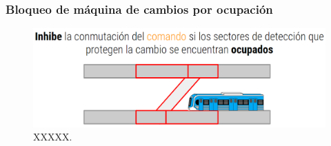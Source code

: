 \subsubsection{Bloqueo de máquina de cambios por ocupación}

\lipsum[1]
    \begin{figure}[!h]
        \centering
        \includegraphics[width=1\textwidth]{Figuras/ocupacion}
        \centering\caption{XXXXX.}
        \label{fig:ocupacion_1}
    \end{figure}
\lipsum[1]